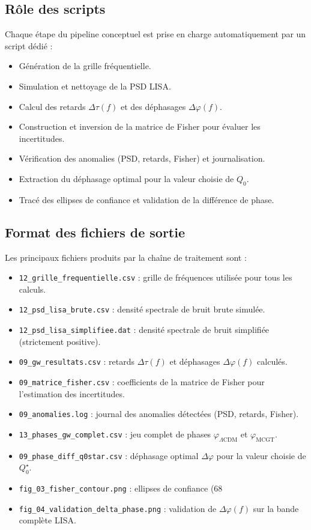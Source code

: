 \subsection{Rôle des scripts}
Chaque étape du pipeline conceptuel est prise en charge automatiquement par un script dédié :

\begin{itemize}
  \item Génération de la grille fréquentielle.
  \item Simulation et nettoyage de la PSD LISA.
  \item Calcul des retards \(\Delta\tau(f)\) et des déphasages \(\Delta\varphi(f)\).
  \item Construction et inversion de la matrice de Fisher pour évaluer les incertitudes.
  \item Vérification des anomalies (PSD, retards, Fisher) et journalisation.
  \item Extraction du déphasage optimal pour la valeur choisie de \(Q_0\).
  \item Tracé des ellipses de confiance et validation de la différence de phase.
\end{itemize}

\subsection{Format des fichiers de sortie}
Les principaux fichiers produits par la chaîne de traitement sont :

\begin{itemize}
  \item \texttt{12\_grille\_frequentielle.csv} : grille de fréquences utilisée pour tous les calculs.
  \item \texttt{12\_psd\_lisa\_brute.csv} : densité spectrale de bruit brute simulée.
  \item \texttt{12\_psd\_lisa\_simplifiee.dat} : densité spectrale de bruit simplifiée (strictement positive).
  \item \texttt{09\_gw\_resultats.csv} : retards \(\Delta\tau(f)\) et déphasages \(\Delta\varphi(f)\) calculés.
  \item \texttt{09\_matrice\_fisher.csv} : coefficients de la matrice de Fisher pour l’estimation des incertitudes.
  \item \texttt{09\_anomalies.log} : journal des anomalies détectées (PSD, retards, Fisher).
  \item \texttt{13\_phases\_gw\_complet.csv} : jeu complet de phases \(\varphi_{\Lambda\mathrm{CDM}}\) et \(\varphi_{\mathrm{MCGT}}\).
  \item \texttt{09\_phase\_diff\_q0star.csv} : déphasage optimal \(\Delta\varphi\) pour la valeur choisie de \(Q_{0}^{\star}\).
  \item \texttt{fig\_03\_fisher\_contour.png} : ellipses de confiance (68 %
  \item \texttt{fig\_04\_validation\_delta\_phase.png} : validation de \(\Delta\varphi(f)\) sur la bande complète LISA.
\end{itemize}

